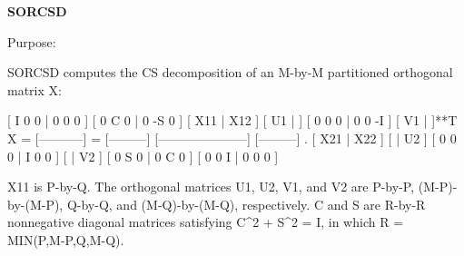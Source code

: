 {\bfseries S\+O\+R\+C\+S\+D} 

 \begin{DoxyParagraph}{Purpose\+: }
\begin{DoxyVerb} SORCSD computes the CS decomposition of an M-by-M partitioned
 orthogonal matrix X:

                                 [  I  0  0 |  0  0  0 ]
                                 [  0  C  0 |  0 -S  0 ]
     [ X11 | X12 ]   [ U1 |    ] [  0  0  0 |  0  0 -I ] [ V1 |    ]**T
 X = [-----------] = [---------] [---------------------] [---------]   .
     [ X21 | X22 ]   [    | U2 ] [  0  0  0 |  I  0  0 ] [    | V2 ]
                                 [  0  S  0 |  0  C  0 ]
                                 [  0  0  I |  0  0  0 ]

 X11 is P-by-Q. The orthogonal matrices U1, U2, V1, and V2 are P-by-P,
 (M-P)-by-(M-P), Q-by-Q, and (M-Q)-by-(M-Q), respectively. C and S are
 R-by-R nonnegative diagonal matrices satisfying C^2 + S^2 = I, in
 which R = MIN(P,M-P,Q,M-Q).\end{DoxyVerb}
 
\end{DoxyParagraph}

